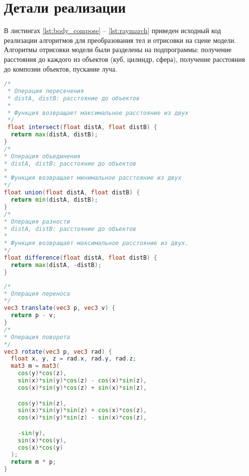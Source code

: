 \section{Детали реализации}
В листингах \ref{lst:body_compose} -- \ref{lst:raymarch} приведен исходный код реализации алгоритмов
для преобразования тел и отрисовки на сцене модели.
Алгоритмы отрисовки модели были разделены на подпрограммы:  
получение расстояния до каждого из объектов (куб, цилиндр, сфера), получение расстояния до композии объектов,
пускание луча.
\begin{lstlisting}[language=GLSL, label=lst:body_compose, caption = {Реализация алгоритмов композиции тел}]
 /*
 * Операция пересечения 
 * distA, distB: расстояние до объектов
 *
 * Функция возвращает максимальное расстояние из двух
 */
 float intersect(float distA, float distB) {
  return max(distA, distB);
}
/*
* Операция объединения 
* distA, distB: расстояние до объектов
*
* Функция возвращает минимальное расстояние из двух
*/
float union(float distA, float distB) {
  return min(distA, distB);
}
/*
* Операция разности 
* distA, distB: расстояние до объектов
*
* Функция возвращает максимальное расстояние из двух.
*/
float difference(float distA, float distB) {
  return max(distA, -distB);
}
\end{lstlisting}
\newpage
\begin{lstlisting}[language=GLSL, label=lst:transform, caption = {Реализация алгоритмов преобразования тела}]
/*
* Операция переноса
*/
vec3 translate(vec3 p, vec3 v) {
  return p - v;
}
/*
* Операция поворота
*/
vec3 rotate(vec3 p, vec3 rad) {
  float x, y, z = rad.x, rad.y, rad.z;
  mat3 m = mat3(
    cos(y)*cos(z),
    sin(x)*sin(y)*cos(z) - cos(x)*sin(z),
    cos(x)*sin(y)*cos(z) + sin(x)*sin(z),

    cos(y)*sin(z),
    sin(x)*sin(y)*sin(z) + cos(x)*cos(z),
    cos(x)*sin(y)*sin(z) - sin(x)*cos(z),

    -sin(y),
    sin(x)*cos(y),
    cos(x)*cos(y)
  );
  return m * p;
}
\end{lstlisting}
